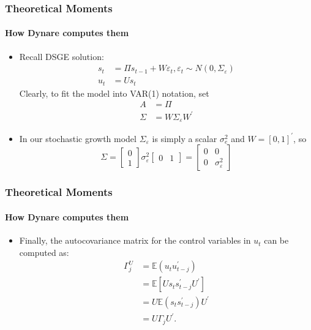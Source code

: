 \documentclass{beamer}
\newcommand{\eps}{\varepsilon}
\newcommand{\E}{\mathbb{E}}
\begin{document}
\begin{frame}
\frametitle{Theoretical Moments}
\framesubtitle{How Dynare computes them}
\small 
\begin{itemize}
	\item Recall DSGE solution:
	\begin{align*}
		s_{t} &=\Pi s_{t-1}+W\varepsilon _{t}, \eps_{t} \sim N(0,\Sigma_{\eps}) \\
		u_{t} &=Us_{t}
	\end{align*}%
	Clearly, to fit the model into VAR(1) notation, set 
	\begin{align*}
		A &=\Pi  \\
		\Sigma  &=W\Sigma _{\varepsilon }W^{\prime }
	\end{align*}
	\item In our stochastic growth model $\Sigma _{\varepsilon }$ is simply a scalar $%
	\sigma _{e}^{2}$ and $W=\left[ 0,1\right] ^{\prime }$, so 
	\begin{equation*}
	\Sigma =%
	\begin{bmatrix}
	0 \\ 
	1%
	\end{bmatrix}%
	\sigma _{\varepsilon }^{2}%
	\begin{bmatrix}
	0 & 1%
	\end{bmatrix}%
	=%
	\begin{bmatrix}
	0 & 0 \\ 
	0 & \sigma _{\varepsilon }^{2}%
	\end{bmatrix}%
	\end{equation*}%
	
\end{itemize}
\end{frame}

\begin{frame}
\frametitle{Theoretical Moments}
\framesubtitle{How Dynare computes them}
\small 
\begin{itemize}
	\item Finally, the autocovariance matrix for the control variables in $ u_{t} $ can be computed as:
	\begin{align*}
	\Gamma _{j}^{U} &=\E\left( u_{t}u_{t-j}^{\prime }\right)  \\
	&=\E\left[ Us_{t}s_{t-j}^{\prime }U^{\prime }\right]  \\
	&=U\E\left( s_{t}s_{t-j}^{\prime }\right) U^{\prime } \\
	&=U\Gamma _{j}U^{\prime }.
	\end{align*}
\end{itemize}
\end{frame}
\end{document}
